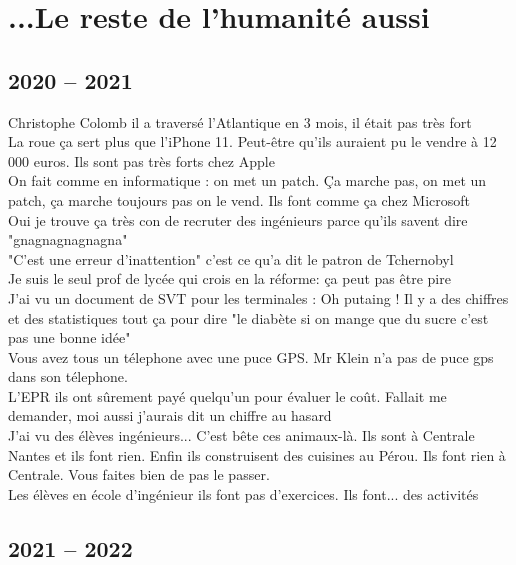\documentclass[french, a4paper, openany]{book}
\begin{document}
\chapter{...Le reste de l'humanité aussi}

\section{2020 -- 2021}

	\noindent \og Christophe Colomb il a traversé l'Atlantique en 3 mois, il était pas très fort \fg \\
	\og La roue ça sert plus que l'iPhone 11. Peut-être qu'ils auraient pu le vendre à 12 000 euros. Ils sont pas très forts chez Apple \fg \\
	\og On fait comme en informatique : on met un patch. Ça marche pas, on met un patch, ça marche toujours pas on le vend. Ils font comme ça chez Microsoft \fg \\
	\og Oui je trouve ça très con de recruter des ingénieurs parce qu'ils savent dire "gnagnagnagnagna" \fg \\
	\og "C'est une erreur d'inattention" c'est ce qu'a dit le patron de Tchernobyl \fg \\
	\og Je suis le seul prof de lycée qui crois en la réforme: ça peut pas être pire \fg \\
	\og J'ai vu un document de SVT pour les terminales : Oh putaing ! Il y a des chiffres et des statistiques tout ça pour dire "le diabète si on mange que du sucre c'est pas une bonne idée" \fg \\
	\og Vous avez tous un télephone avec une puce GPS. Mr Klein n'a pas de puce gps dans son télephone. \fg \\
	\og L'EPR ils ont sûrement payé quelqu'un pour évaluer le coût. Fallait me demander, moi aussi j'aurais dit un chiffre au hasard \fg \\
	\og J'ai vu des élèves ingénieurs... C'est bête ces animaux-là. Ils sont à Centrale Nantes et ils font rien. Enfin ils construisent des cuisines au Pérou. Ils font rien à Centrale. Vous faites bien de pas le passer. \fg \\
	\og Les élèves en école d'ingénieur ils font pas d'exercices. Ils font... des activités \fg \\

\section{2021 -- 2022}
\end{document}
